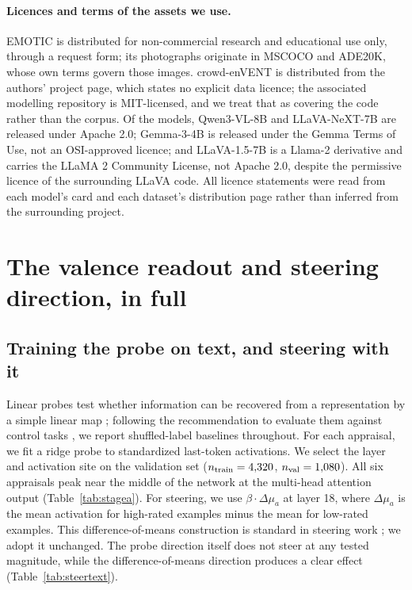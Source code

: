 \documentclass{article}
\newcommand{\gemma}{Gemma-3-4B}
\newcommand{\qwen}{Qwen3-VL-8B}
\newcommand{\llava}{LLaVA-1.5-7B}
\newcommand{\llavanext}{LLaVA-NeXT-7B}
\begin{document}
\paragraph{Licences and terms of the assets we use.}
EMOTIC \citep{kosti2019} is distributed for non-commercial research and educational use only, through a request form; its photographs originate in MSCOCO and ADE20K, whose own terms govern those images. crowd-enVENT \citep{troiano2023} is distributed from the authors' project page, which states no explicit data licence; the associated modelling repository is MIT-licensed, and we treat that as covering the code rather than the corpus. Of the models, \qwen{} \citep{qwen3vl} and \llavanext{} \citep{llavanext} are released under Apache 2.0; \gemma{} \citep{gemma3} is released under the Gemma Terms of Use, not an OSI-approved licence; and \llava{} \citep{llava15} is a Llama-2 derivative and carries the LLaMA 2 Community License, not Apache 2.0, despite the permissive licence of the surrounding LLaVA code. All licence statements were read from each model's card and each dataset's distribution page rather than inferred from the surrounding project.

\section{The valence readout and steering direction, in full}
\label{app:foundations}

\subsection{Training the probe on text, and steering with it}
Linear probes test whether information can be recovered from a representation by a simple linear map \citep{alain2016}; following the recommendation to evaluate them against control tasks \citep{hewitt2019}, we report shuffled-label baselines throughout. For each appraisal, we fit a ridge probe to standardized last-token activations. We select the layer and activation site on the validation set ($n_{\rm train} = 4{,}320$, $n_{\rm val} = 1{,}080$). All six appraisals peak near the middle of the network at the multi-head attention output (Table~\ref{tab:stagea}). For steering, we use $\beta \cdot \Delta\mu_a$ at layer 18, where $\Delta\mu_a$ is the mean activation for high-rated examples minus the mean for low-rated examples. This difference-of-means construction is standard in steering work \citep{marks2023, li2023iti, zou2023, arditi2024}; we adopt it unchanged. The probe direction itself does not steer at any tested magnitude, while the difference-of-means direction produces a clear effect (Table~\ref{tab:steertext}).
\end{document}
